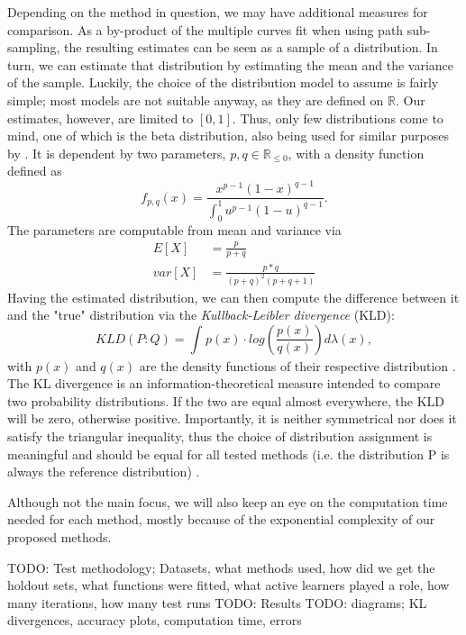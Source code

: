 Depending on the method in question, we may have additional measures for comparison. As a by-product of the multiple curves fit when using path sub-sampling, the resulting estimates can be seen as a sample of a distribution. In turn, we can estimate that distribution by estimating the mean and the variance of the sample. Luckily, the choice of the distribution model to assume is fairly simple; most models are not suitable anyway, as they are defined on $\mathbb{R}$. Our estimates, however, are limited to $[0,1]$. Thus, only few distributions come to mind, one of which is the beta distribution, also being used for similar purposes by \cite{KremplEtAl2014}. It is dependent by two parameters, $p, q \in \mathbb{R}_{\le 0}$, with a density function defined as \cite{GuptaEtAl2004}
\begin{equation}
f_{p, q}(x) = \frac{x^{p-1}(1-x)^{q-1}}{\int_{0}^{1} u^{p-1}(1-u)^{q-1}}.
\end{equation}
The parameters are computable from mean and variance via
\begin{equation}
\begin{split}
E[X] &= \frac{p}{p+q} \\
var[X] &= \frac{p*q}{(p+q)^2(p+q+1)}
\end{split}
\end{equation}
Having the estimated distribution, we can then compute the difference between it and the "true" distribution via the \textit{Kullback-Leibler divergence} (KLD):
\begin{equation}
KLD(P:Q) = \int_{}^{} p(x) \cdot log\left(\frac{p(x)}{q(x)}\right) d\lambda (x),
\end{equation}
with $p(x)$ and $q(x)$ are the density functions of their respective distribution \cite{KullbackEtAl1951}. The KL divergence is an information-theoretical measure intended to compare two probability distributions. If the two are equal almost everywhere, the KLD will be zero, otherwise positive. Importantly, it is neither symmetrical nor does it satisfy the triangular inequality, thus the choice of distribution assignment is meaningful and should be equal for all tested methods (i.e. the distribution P is always the reference distribution) \cite{Joyce2011}.

Although not the main focus, we will also keep an eye on the computation time needed for each method, mostly because of the exponential complexity of our proposed methods.


TODO: Test methodology; Datasets, what methods used, how did we get the holdout sets, what functions were fitted, what active learners played a role, how many iterations, how many test runs
TODO: Results
TODO: diagrams; KL divergences, accuracy plots, computation time, errors



